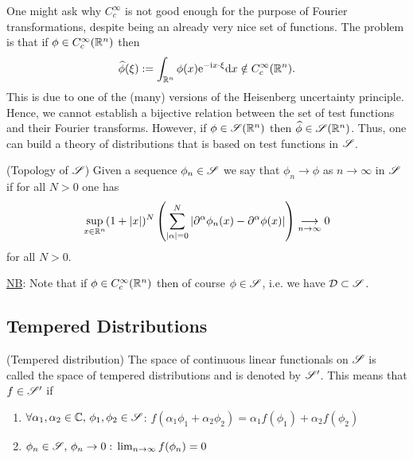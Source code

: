 \documentclass[11pt]{article}
\begin{document}
			
			\begin{remark}
				One might ask why $C^\infty_c$ is not good enough for the purpose of Fourier transformations, despite being an already very nice set of functions. The problem is that if $\phi\in C^\infty_c(\mathbb{R}^n)$ then
				\begin{equation*}
					\widehat{\phi}(\xi):=\int_{\mathbb{R}^n}\phi(x)\mathrm{e}^{-\mathrm{i} x\cdot\xi}\mathrm{d}x\notin C^\infty_c(\mathbb{R}^n).
				\end{equation*}
				This is due to one of the (many) versions of the Heisenberg uncertainty principle. Hence, we cannot establish a bijective relation between the set of test functions and their Fourier transforms. However, if $\phi\in\mathscr{S}(\mathbb{R}^n)$ then $\widehat{\phi}\in\mathscr{S}(\mathbb{R}^n)$. Thus, one can build a theory of distributions that is based on test functions in $\mathscr{S}$.
			\end{remark}

			\begin{defi}
				(Topology of $\mathscr{S}$) Given a sequence $\phi_n\in\mathscr{S}$ we say that $\phi_n\to\phi$ as $n\to\infty$ in $\mathscr{S}$ if for all $N>0$ one has
				\begin{equation*}
					\sup_{x\in\mathbb{R}^n}(1+|x|)^N\left(\sum_{|\alpha|=0}^N|\partial^\alpha\phi_n(x)-\partial^\alpha\phi(x)|\right)\underset{n\to\infty}{\longrightarrow}0
				\end{equation*}
				for all $N>0$.
			\end{defi}

			\noindent\underline{NB}: Note that if $\phi\in C^\infty_c(\mathbb{R}^n)$ then of course $\phi\in\mathscr{S}$, i.e. we have $\mathcal{D}\subset\mathscr{S}$.


		\subsection{Tempered Distributions}

			\begin{defi}
				(Tempered distribution) The space of continuous linear functionals on $\mathscr{S}$ is called the space of tempered distributions and is denoted by $\mathscr{S}^\prime$. This means that $f\in\mathscr{S}^\prime$ if
				\begin{enumerate}
					\item $\forall\alpha_1,\alpha_2\in\mathbb{C},\,\phi_1,\phi_2\in\mathscr{S}$: $f(\alpha_1\phi_1+\alpha_2\phi_2)=\alpha_1f(\phi_1)+\alpha_2f(\phi_2)$
					\item $\phi_n\in\mathscr{S},\,\phi_n\to0:\,\lim_{n\to\infty}f(\phi_n)=0$
				\end{enumerate}
			\end{defi}
\end{document}
